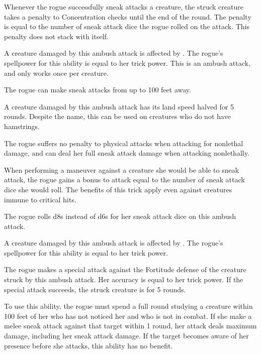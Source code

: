 Whenever the rogue successfully sneak attacks a creature, the struck creature takes a penalty to Concentration checks until the end of the round.
The penalty is equal to the number of sneak attack dice the rogue rolled on the attack.
This penalty does not stack with itself.

A creature damaged by this ambush attack is affected by .
The rogue's spellpower for this ability is equal to her trick power.
This is an ambush attack, and only works once per creature.

The rogue can make sneak attacks from up to 100 feet away.

A creature damaged by this ambush attack has its land speed halved for 5 rounds.
Despite the name, this can be used on creatures who do not have hamstrings.

The rogue suffers no penalty to physical attacks when attacking for nonlethal damage, and can deal her full sneak attack damage when attacking nonlethally.


When performing a maneuver against a creature she would be able to sneak attack, the rogue gains a bonus to attack equal to the number of sneak attack dice she would roll.
The benefits of this trick apply even against creatures immune to critical hits.

The rogue rolls d8s instead of d6s for her sneak attack dice on this ambush attack.

A creature damaged by this ambush attack is affected by .
The rogue's spellpower for this ability is equal to her trick power.

The rogue makes a special attack against the Fortitude defense of the creature struck by this ambush attack.
Her accuracy is equal to her trick power.
If the special attack succeeds, the struck creature is \staggered for 5 rounds.

To use this ability, the rogue must spend a full round studying a creature within 100 feet of her who has not noticed her and who is not in combat.
If she make a melee sneak attack against that target within 1 round, her attack deals maximum damage, including her sneak attack damage.
If the target becomes aware of her presence before she attacks, this ability has no benefit.

